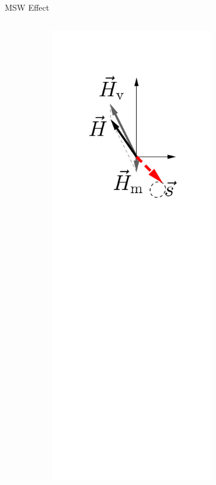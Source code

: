 \begin{frame}{MSW Effect}
\begin{columns}[T]
\begin{column}{0.33\textwidth}
\end{column}
\begin{column}{0.33\textwidth}

\pause

\begin{figure}
    \centering
    \colorbox{white}{\includegraphics[width=0.7\textwidth]{assets/matter-effect-adiabatic-3}}
\end{figure}



\end{column}
\end{columns}



\end{frame}



